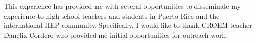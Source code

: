 This experience has provided me with several opportunities to disseminate my experience to high-school teachers and students in Puerto Rico and the international HEP community. Specifically, I would like to thank CROEM teacher Danelix Cordero who provided me initial opportunities for outreach work.

